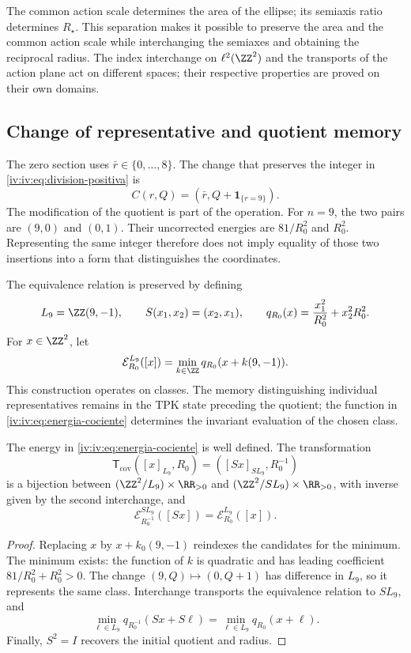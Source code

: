 The common action scale determines the area of the ellipse; its semiaxis
ratio determines \(R_\star\). This separation makes it possible to preserve
the area and the common action scale while interchanging the semiaxes and obtaining
the reciprocal radius. The index interchange on \(\ell^2(\ZZ^2)\)
and the transports of the action plane act on different spaces;
their respective properties are proved on their own domains.

\subsection{Change of representative and quotient memory}

The zero section uses \(\bar r\in\{0,\ldots,8\}\). The change
that preserves the integer in \eqref{iv:iv:eq:division-positiva} is
\begin{equation}
 C(r,Q)=(\bar r,Q+\mathbf1_{\{r=9\}}).
 \label{iv:iv:eq:cambio-seccion}
\end{equation}
The modification of the quotient is part of the operation.
For \(n=9\), the two pairs are \((9,0)\) and \((0,1)\).
Their uncorrected energies are \(81/R_0^2\) and \(R_0^2\).
Representing the same integer therefore does not imply equality of
those two insertions into a form that distinguishes the coordinates.

The equivalence relation is preserved by defining
\[
 L_9=\ZZ(9,-1),\qquad S(x_1,x_2)=(x_2,x_1),
 \qquad q_{R_0}(x)=\frac{x_1^2}{R_0^2}+x_2^2R_0^2.
\]
For \(x\in\ZZ^2\), let
\begin{equation}
 \mathcal E_{R_0}^{L_9}([x])
 =\min_{k\in\ZZ}q_{R_0}(x+k(9,-1)).
 \label{iv:iv:eq:energia-cociente}
\end{equation}
This construction operates on classes. The memory distinguishing
individual representatives remains in the TPK state preceding
the quotient; the function in \eqref{iv:iv:eq:energia-cociente}
determines the invariant evaluation of the chosen class.

\begin{theorem}
\label{iv:iv:thm:dualidad-cociente}
The energy in \eqref{iv:iv:eq:energia-cociente} is well defined.
The transformation
\[
 \mathsf T_{\mathrm{cov}}([x]_{L_9},R_0)
 =([Sx]_{SL_9},R_0^{-1})
\]
is a bijection between
\((\ZZ^2/L_9)\times\RR_{>0}\) and
\((\ZZ^2/SL_9)\times\RR_{>0}\), with inverse given by the
second interchange, and
\[
 \mathcal E_{R_0^{-1}}^{SL_9}([Sx])
 =\mathcal E_{R_0}^{L_9}([x]).
\]
\end{theorem}
\begin{proof}
Replacing \(x\) by \(x+k_0(9,-1)\) reindexes the candidates
for the minimum. The minimum exists: the function of \(k\) is quadratic and
has leading coefficient \(81/R_0^2+R_0^2>0\). The change
\((9,Q)\mapsto(0,Q+1)\) has difference in \(L_9\), so
it represents the same class. Interchange transports
the equivalence relation to \(SL_9\), and
\[
 \min_{\ell\in L_9}q_{R_0^{-1}}(Sx+S\ell)
 =\min_{\ell\in L_9}q_{R_0}(x+\ell).
\]
Finally, \(S^2=I\) recovers the initial quotient and radius.
\end{proof}

